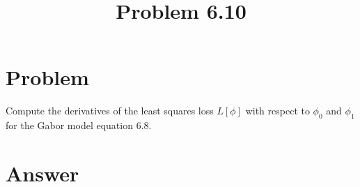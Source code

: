 \documentclass{article}
\title{Problem 6.10}
\begin{document}
\section{Problem}

Compute the derivatives of the least squares loss $ L [ \phi ] $  with respect to $ \phi_0 $ and $\phi_1$ for the Gabor model equation 6.8. 

\section{Answer}
\end{document}
